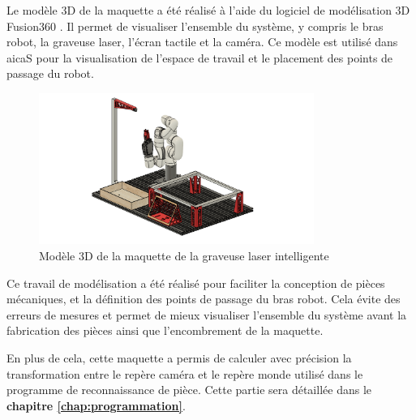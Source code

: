 Le modèle 3D de la maquette a été réalisé à l'aide du logiciel de modélisation 3D Fusion360 \cite{Fusion360Docs}. Il permet de visualiser l'ensemble du système, y compris le bras robot, la graveuse laser, l'écran tactile et la caméra. Ce modèle est utilisé dans \gls{aicaS} pour la visualisation de l'espace de travail et le placement des points de passage du robot.

\begin{figure}[H]
    \centering
    \includegraphics[width=0.8\textwidth]{assets/figures/modele_3d.png}
    \caption{Modèle 3D de la maquette de la graveuse laser intelligente}
    \label{fig:maquette_3d}
\end{figure}

Ce travail de modélisation a été réalisé pour faciliter la conception de pièces mécaniques, et la définition des points de passage du bras robot. Cela évite des erreurs de mesures et permet de mieux visualiser l'ensemble du système avant la fabrication des pièces ainsi que l'encombrement de la maquette.

En plus de cela, cette maquette a permis de calculer avec précision la transformation entre le repère caméra et le repère monde utilisé dans le programme de reconnaissance de pièce. Cette partie sera détaillée dans le \textbf{chapitre \ref{chap:programmation}}.
